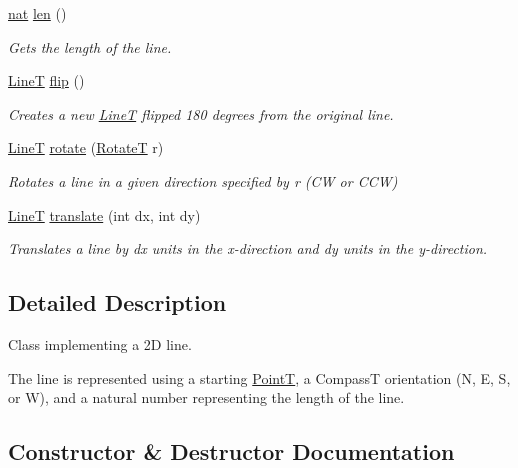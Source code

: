 \begin{DoxyCompactItemize}
\mbox{\hyperlink{_path_a_d_t_8h_a56638ee9d162e8cce3a15f92d2023d6e}{nat}} \mbox{\hyperlink{class_line_t_a89f2a51bee8acb60e6a0aa1c52a195f7}{len}} ()
\begin{DoxyCompactList}\small\item\em Gets the length of the line. \end{DoxyCompactList}\item 
\mbox{\hyperlink{class_line_t}{LineT}} \mbox{\hyperlink{class_line_t_a0db306d68e88b498c92a225c9404cd4c}{flip}} ()
\begin{DoxyCompactList}\small\item\em Creates a new \mbox{\hyperlink{class_line_t}{LineT}} flipped 180 degrees from the original line. \end{DoxyCompactList}\item 
\mbox{\hyperlink{class_line_t}{LineT}} \mbox{\hyperlink{class_line_t_a427979474891765018a3a30f458313a3}{rotate}} (\mbox{\hyperlink{_map_types_8h_a86e9c41121ebe1e27666eb8a30668ffb}{RotateT}} r)
\begin{DoxyCompactList}\small\item\em Rotates a line in a given direction specified by r (CW or C\+CW) \end{DoxyCompactList}\item 
\mbox{\hyperlink{class_line_t}{LineT}} \mbox{\hyperlink{class_line_t_a3c70c0e1f35f2966f61b840af34cbd5a}{translate}} (int dx, int dy)
\begin{DoxyCompactList}\small\item\em Translates a line by dx units in the x-\/direction and dy units in the y-\/direction. \end{DoxyCompactList}\end{DoxyCompactItemize}


\subsection{Detailed Description}
Class implementing a 2D line. 

The line is represented using a starting \mbox{\hyperlink{class_point_t}{PointT}}, a CompassT orientation (N, E, S, or W), and a natural number representing the length of the line. 

\subsection{Constructor \& Destructor Documentation}
\mbox{\label{class_line_t_a51d13d4deda368693b417b3b6c5dea46}} 
